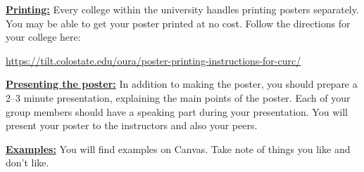 \documentclass[12pt]{article}
\begin{document}
\underline{\textbf{Printing:}} Every college within the university handles printing posters separately. You may be able to get your poster printed at no cost. Follow the directions for your college here: 

\url{https://tilt.colostate.edu/oura/poster-printing-instructions-for-curc/}

\underline{\textbf{Presenting the poster:}} In addition to making the poster, you should prepare a 2--3 minute presentation, explaining the main points of the poster. Each of your group members should have a speaking part during your presentation. You will present your poster to the instructors and also your peers.

\underline{\textbf{Examples:}} You will find examples on Canvas. Take note of things you like and don't like.
\end{document}
